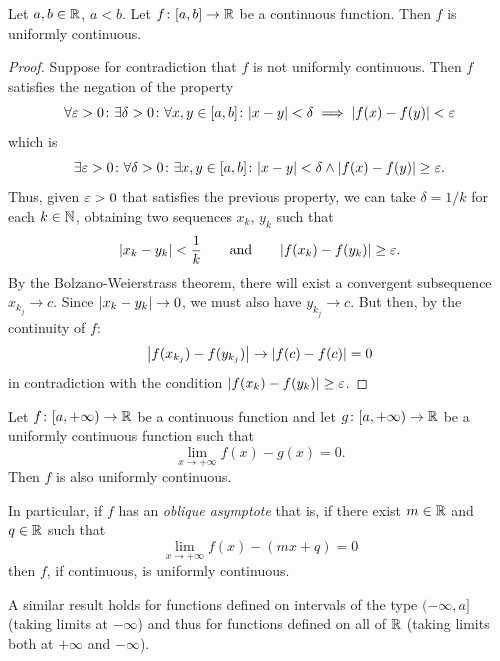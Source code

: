 \begin{theorem}
  \label{th:heine_cantor}%
  \mymark{***}%
Let $a,b\in {\mathbb R}$, $a<b$.
Let $f\colon [a,b]\to {\mathbb R}$ be a continuous function.
Then $f$ is uniformly continuous.
\end{theorem}
%
\begin{proof}
\mymark{***}%
Suppose for contradiction that $f$ is not uniformly continuous. Then $f$
satisfies the negation of the property
\[
 \forall \varepsilon>0\colon \exists \delta > 0 \colon
 \forall x,y\in [a,b] \colon {\left|x-y\right|} < \delta \implies {\left|f(x)-f(y)\right|} < \varepsilon
\]
which is
\[
 \exists \varepsilon>0\colon \forall \delta > 0 \colon
 \exists x,y \in [a,b] \colon {\left|x-y\right|} < \delta \land {\left|f(x)-f(y)\right|} \ge \varepsilon.
\]
Thus, given $\varepsilon>0$ that satisfies the previous property, we can take
$\delta=1/k$ for each $k\in {\mathbb N}$, obtaining two sequences $x_k$, $y_k$ such that
\[
  {\left|x_k-y_k\right|} < \frac 1 k \qquad\text{and}\qquad {\left|f(x_k) - f(y_k)\right|} \ge \varepsilon.
\]
By the Bolzano-Weierstrass theorem, there will exist a convergent subsequence
$x_{k_j} \to c$.
Since ${\left|x_k-y_k\right|}\to 0$, we must also have $y_{k_j}\to c$.
But then, by the continuity of $f$:
\[
 {\left|f(x_{k_j})-f(y_{k_j})\right|} \to {\left|f(c) - f(c)\right|} = 0
\]
in contradiction with the condition ${\left|f(x_k)-f(y_k)\right|}\ge \varepsilon$.
\end{proof}

\begin{theorem}[asymptote]
Let $f\colon [a,+\infty) \to {\mathbb R}$ be a continuous function and let $g\colon
[a,+\infty) \to {\mathbb R}$ be a uniformly continuous function such that
\[
  \lim_{x\to +\infty} f(x) - g(x) = 0.
\]
Then $f$ is also uniformly continuous.

In particular, if $f$ has an \emph{oblique asymptote}%
%
 that is, if there exist $m\in {\mathbb R}$ and $q\in {\mathbb R}$ such that
\[
  \lim_{x\to +\infty} f(x) - (mx + q)  = 0
\]
then $f$, if continuous, is uniformly continuous.

A similar result holds for functions defined on intervals of the type
$(-\infty,a]$ (taking limits at $-\infty$) and thus for functions defined on all
of ${\mathbb R}$ (taking limits both at $+\infty$ and $-\infty$).
\end{theorem}

